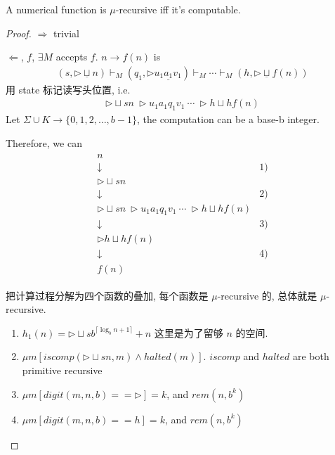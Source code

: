 \begin{theorem}
    A numerical function is $\mu$-recursive iff it's computable.
\end{theorem}
\begin{proof}
    $\Rightarrow$ trivial

    $\Leftarrow$, $f$, $\exists M$ accepts $f$. $n\to f(n)$ is
    \begin{align*}
        (s, \triangleright \underline{\sqcup}n)\vdash_M (q_1, \triangleright u_1 \underline{a_1} v_1) \vdash_M \cdots \vdash_M (h, \triangleright \underline{\sqcup}f(n))
    \end{align*}
    用 state 标记读写头位置, i.e.
    \begin{align*}
        \triangleright \sqcup s n\ \triangleright u_1 a_1 q_1 v_1\ \cdots\ \triangleright h\sqcup h f(n)
    \end{align*}
    Let $\Sigma \cup K\to\{ 0, 1,2, \dots,b-1 \}$, the computation can be a base-b integer. 

    Therefore, we can
    \begin{align*}
        \begin{array}{cl}
            n\\
            \downarrow & 1)\\
            \triangleright \sqcup s n\\
            \downarrow & 2)\\
            \triangleright \sqcup s n\ \triangleright u_1 a_1 q_1 v_1\ \cdots\ \triangleright h\sqcup h f(n)\\
            \downarrow & 3)\\
            \triangleright h\sqcup h f(n)\\
            \downarrow & 4)\\
            f(n)
        \end{array}
    \end{align*}

    把计算过程分解为四个函数的叠加, 每个函数是 $\mu$-recursive 的, 总体就是 $\mu$-recursive. 

    \begin{enumerate}
        \item $\displaystyle h_1(n)=\triangleright \sqcup s b^{\lceil \log_b n+1 \rceil} + n$ 
        \subitem 这里是为了留够 $n$ 的空间. 
        \item $\mu m[iscomp(\triangleright \sqcup sn, m)\land halted(m)]$. $iscomp$ and $halted$ are both primitive recursive
        \item $\mu m[digit(m,n,b)==\triangleright]=k$, and $rem(n, b^k)$
        \item $\mu m[digit(m,n,b)==h]=k$, and $rem(n, b^k)$
    \end{enumerate}
\end{proof}